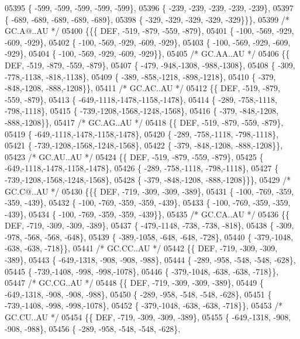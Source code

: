 \begin{DoxyCode}
05395 \{ -599, -599, -599, -599, -599\},
05396 \{ -239, -239, -239, -239, -239\},
05397 \{ -689, -689, -689, -689, -689\},
05398 \{ -329, -329, -329, -329, -329\}\}\},
05399 \textcolor{comment}{/* GC.A@..AU */}
05400 \{\{\{  DEF, -519, -879, -559, -879\},
05401 \{ -100, -569, -929, -609, -929\},
05402 \{ -100, -569, -929, -609, -929\},
05403 \{ -100, -569, -929, -609, -929\},
05404 \{ -100, -569, -929, -609, -929\}\},
05405 \textcolor{comment}{/* GC.AA..AU */}
05406 \{\{  DEF, -519, -879, -559, -879\},
05407 \{ -479, -948,-1308, -988,-1308\},
05408 \{ -309, -778,-1138, -818,-1138\},
05409 \{ -389, -858,-1218, -898,-1218\},
05410 \{ -379, -848,-1208, -888,-1208\}\},
05411 \textcolor{comment}{/* GC.AC..AU */}
05412 \{\{  DEF, -519, -879, -559, -879\},
05413 \{ -649,-1118,-1478,-1158,-1478\},
05414 \{ -289, -758,-1118, -798,-1118\},
05415 \{ -739,-1208,-1568,-1248,-1568\},
05416 \{ -379, -848,-1208, -888,-1208\}\},
05417 \textcolor{comment}{/* GC.AG..AU */}
05418 \{\{  DEF, -519, -879, -559, -879\},
05419 \{ -649,-1118,-1478,-1158,-1478\},
05420 \{ -289, -758,-1118, -798,-1118\},
05421 \{ -739,-1208,-1568,-1248,-1568\},
05422 \{ -379, -848,-1208, -888,-1208\}\},
05423 \textcolor{comment}{/* GC.AU..AU */}
05424 \{\{  DEF, -519, -879, -559, -879\},
05425 \{ -649,-1118,-1478,-1158,-1478\},
05426 \{ -289, -758,-1118, -798,-1118\},
05427 \{ -739,-1208,-1568,-1248,-1568\},
05428 \{ -379, -848,-1208, -888,-1208\}\}\},
05429 \textcolor{comment}{/* GC.C@..AU */}
05430 \{\{\{  DEF, -719, -309, -309, -389\},
05431 \{ -100, -769, -359, -359, -439\},
05432 \{ -100, -769, -359, -359, -439\},
05433 \{ -100, -769, -359, -359, -439\},
05434 \{ -100, -769, -359, -359, -439\}\},
05435 \textcolor{comment}{/* GC.CA..AU */}
05436 \{\{  DEF, -719, -309, -309, -389\},
05437 \{ -479,-1148, -738, -738, -818\},
05438 \{ -309, -978, -568, -568, -648\},
05439 \{ -389,-1058, -648, -648, -728\},
05440 \{ -379,-1048, -638, -638, -718\}\},
05441 \textcolor{comment}{/* GC.CC..AU */}
05442 \{\{  DEF, -719, -309, -309, -389\},
05443 \{ -649,-1318, -908, -908, -988\},
05444 \{ -289, -958, -548, -548, -628\},
05445 \{ -739,-1408, -998, -998,-1078\},
05446 \{ -379,-1048, -638, -638, -718\}\},
05447 \textcolor{comment}{/* GC.CG..AU */}
05448 \{\{  DEF, -719, -309, -309, -389\},
05449 \{ -649,-1318, -908, -908, -988\},
05450 \{ -289, -958, -548, -548, -628\},
05451 \{ -739,-1408, -998, -998,-1078\},
05452 \{ -379,-1048, -638, -638, -718\}\},
05453 \textcolor{comment}{/* GC.CU..AU */}
05454 \{\{  DEF, -719, -309, -309, -389\},
05455 \{ -649,-1318, -908, -908, -988\},
05456 \{ -289, -958, -548, -548, -628\},

\end{DoxyCode}
